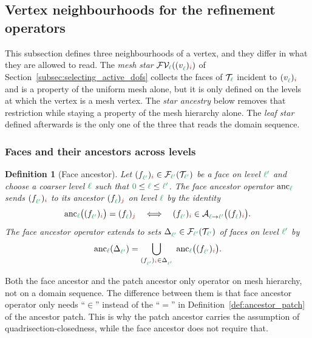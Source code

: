 \documentclass[a4paper, 12pt]{article}
\makeatletter
\newcommand{\green}{\color{ForestGreen}}
\newcommand{\brickred}{\color{BrickRed}}
\newcommand{\T}{\mathcal{T}}
\newcommand{\V}{\mathcal{V}}
\newcommand{\F}{\mathcal{F}}
\DeclareRobustCommand{\simplexsubsetTwo}[2][]{\Delta\ifx\@empty#1\@empty\else^{#1}\fi_{#2}}
\newcommand{\vertex}[2]{\freeQ{v}{}{#1}{#2}}
\newcommand{\face}[2]{\freeQ{f}{}{#1}{#2}}
\newcommand{\FVl}[1]{\F\V_{#1}}
\newcommand{\coarseIdxone}{{\brickred i}}
\newcommand{\fineIdxone}{{\brickred j}}
\renewcommand{\l}{{\green\ell}}
\newcommand{\lzero}{{\green 0}}
\newcommand{\lone}{{\green {\l'}  }}
\newcommand{\freeQ}[4]{ ( {#1}^{#2}_{#3} )_{#4}}
\newcommand{\Aop}[3]{\mathcal{A}^{#1}_{{#2} \to {#3}}}
\newtheorem{definition}[theorem]{Definition}
\theoremstyle{definition}
\theoremstyle{plain}
\numberwithin{equation}{section}
\newcommand{\anc}[1]{\mathrm{anc}_{#1}}                     %
\makeatother
\begin{document}
\subsection{Vertex neighbourhoods for the refinement operators}
\label{subsec:vertex_neighbourhoods}

This subsection defines three neighbourhoods of a vertex, and they differ in what they are allowed to read. The \emph{mesh star} $\FVl{\l}(\vertex{\l}{\coarseIdxone})$ of Section~\ref{subsec:selecting_active_dofs} collects the faces of $\T_\l$ incident to $\vertex{\l}{\coarseIdxone}$ and is a property of the uniform mesh alone, but it is only defined on the levels at which the vertex is a mesh vertex. The \emph{star ancestry} below removes that restriction while staying a property of the mesh hierarchy alone. The \emph{leaf star} defined afterwards is the only one of the three that reads the domain sequence.

\subsubsection{Faces and their ancestors across levels}
\label{subsubsec:faces_across_levels}

\begin{definition}[Face ancestor]
    \label{def:face_ancestor}
    Let $\face{\lone}{\coarseIdxone} \in \F_\lone(\T_\lone)$ be a face on level $\lone$ and choose a coarser level $\l$ such that $\lzero \leq \l \leq \lone$. The \emph{face ancestor} operator $\anc{\l}$ sends $\face{\lone}{\coarseIdxone}$ to its ancestor $\face{\l}{\fineIdxone}$ on level $\l$ by the identity
    \begin{equation}
        \label{eq:face_ancestor}
        \anc{\l} \big( \face{\lone}{\coarseIdxone} \big) = \face{\l}{\fineIdxone} \quad \Longleftrightarrow \quad \face{\lone}{\coarseIdxone} \in \Aop{}{\l}{\lone} \big( \face{\l}{\coarseIdxone} \big).
    \end{equation}
    The face ancestor operator extends to sets $\simplexsubsetTwo{\lone} \in \F_{\lone}(\T_\lone)$ of faces on level $\lone$ by
    \begin{equation}
        \anc{\l}(\simplexsubsetTwo{\lone}) = \bigcup_{\face{\lone}{\coarseIdxone} \in \simplexsubsetTwo{\lone}} \; \anc{\l} \big(\face{\lone}{\coarseIdxone} \big).
    \end{equation}
\end{definition}

Both the face ancestor and the patch ancestor only operator on mesh hierarchy, not on a domain sequence. The difference between them is that face ancestor operator only needs ``$\in$'' instead of the ``$=$'' in Definition~\ref{def:ancestor_patch} of the ancestor patch. This is why the patch ancestor carries the assumption of quadrisection-closedness, while the face ancestor does not require that.
\end{document}
